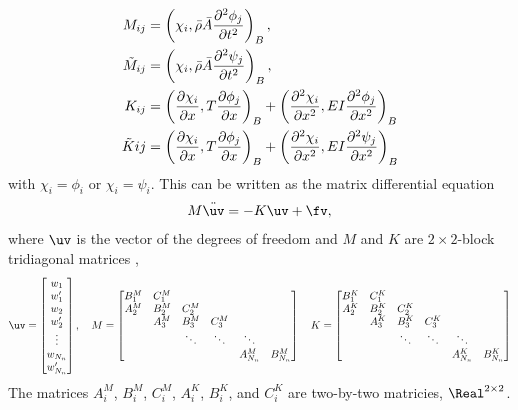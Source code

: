 \documentclass[11pt]{article}
\begin{document}
\begin{align}
  M_{ij} &= \left( \chi_i,  \bar{\rho} \bar{A} \frac{\partial^2 \phi_j}{\partial t^2} \right)_B , \\
  \tilde{M}_{ij} &= \left( \chi_i,  \bar{\rho} \bar{A} \frac{\partial^2 \psi_j}{\partial t^2} \right)_B , \\
  K_{ij} &= \left( \frac{\partial \chi_i}{\partial x} , T \frac{\partial \phi_j}{\partial x} \right)_B
               + \left(\frac{\partial^2 \chi_i}{\partial x^2}, E I \frac{\partial^2 \phi_j}{\partial x^2}\right)_B \\
  \tilde{K}{ij} &= \left( \frac{\partial \chi_i}{\partial x} , T \frac{\partial \phi_j}{\partial x} \right)_B
                + \left(\frac{\partial^2 \chi_i}{\partial x^2}, E I \frac{\partial^2 \psi_j}{\partial x^2}\right)_B 
\end{align}
with $\chi_i = \phi_i$ or $\chi_i=\psi_i$.
This can be written as the matrix differential equation
\begin{align}
   M \ddot\uv = - K \uv + \fv , \label{eq:beamODE}
\end{align}
where $\uv$ is the vector of the degrees of freedom and 
$M$ and $K$ are $2\times2$-block tridiagonal matrices , 
\begin{align}
   \uv = \begin{bmatrix} w_1 \\ w'_1 \\ w_2 \\ w'_2 \\ \vdots \\ w_{\Nn} \\ w'_{\Nn} \end{bmatrix} , 
\quad 
   M = \begin{bmatrix} 
          B^M_1 & C^M_1 &     &      &     &     \\ 
          A^M_2 & B^M_2 & C^M_2 &      &     &     \\
              & A^M_3 & B^M_3 & C^M_3  &     &     \\
              &     & \ddots & \ddots  & \ddots  & \\
              &     &     &     & A^M_{\Nn} & B^M_{\Nn}
           \end{bmatrix} 
\quad               
   K = \begin{bmatrix} 
          B^K_1 & C^K_1 &     &      &     &     \\ 
          A^K_2 & B^K_2 & C^K_2 &      &     &     \\
              & A^K_3 & B^K_3 & C^K_3  &     &     \\
              &     & \ddots & \ddots  & \ddots  & \\
              &     &     &     & A^K_{\Nn} & B^K_{\Nn}
           \end{bmatrix} 
\end{align}
The matrices $A^M_i$, $B^M_i$, $C^M_i$,  $A^K_i$, $B^K_i$, and $C^K_i$ are two-by-two matricies, $\Real^{2\times2}$.
\end{document}
